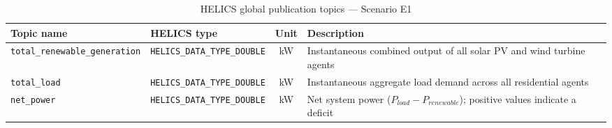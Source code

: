\begin{table}[h]
    \centering
    \caption{HELICS global publication topics --- Scenario E1}
    \label{tab:helics-topics}
    \small
    \begin{tabular}{|l|l|c|p{5.5cm}|}
        \hline
        \textbf{Topic name} & \textbf{HELICS type} & \textbf{Unit} & \textbf{Description} \\
        \hline
        \texttt{total\_renewable\_generation} & \texttt{HELICS\_DATA\_TYPE\_DOUBLE} & kW & Instantaneous combined output of all solar PV and wind turbine agents \\
        \hline
        \texttt{total\_load} & \texttt{HELICS\_DATA\_TYPE\_DOUBLE} & kW & Instantaneous aggregate load demand across all residential agents \\
        \hline
        \texttt{net\_power} & \texttt{HELICS\_DATA\_TYPE\_DOUBLE} & kW & Net system power ($P_{load} - P_{renewable}$); positive values indicate a deficit \\
        \hline
    \end{tabular}
\end{table}
